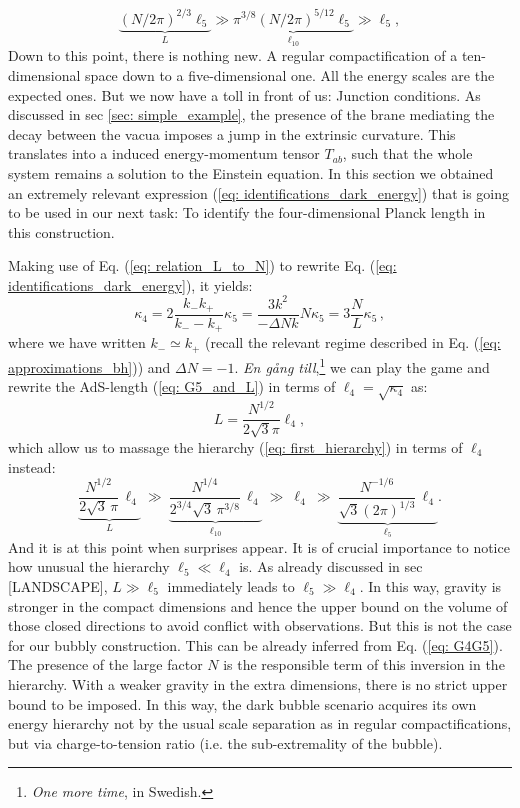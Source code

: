 \begin{equation}\label{eq: first_hierarchy}
    \underbrace{\left(N/2 \pi \right)^{2/3} \ell_5}_{L} \gg\underbrace{\pi^{3/8} \left(N/2\pi\right)^{5/12} \ell_{5}}_{\ell_{10}}\gg \ell_{5},
\end{equation}
Down to this point, there is nothing new. A regular compactification of a ten-dimensional space down to a five-dimensional one. All the energy scales are the expected ones. But we now have a toll in front of us: Junction conditions. As discussed in sec \ref{sec: simple_example}, the presence of the brane mediating the decay between the vacua imposes a jump in the extrinsic curvature. This translates into a induced energy-momentum tensor $T_{ab}$, such that the whole system remains a solution to the Einstein equation. In this section we obtained an extremely relevant expression (\ref{eq: identifications_dark_energy}) that is going to be used in our next task: To identify the four-dimensional Planck length in this construction.

Making use of Eq. (\ref{eq: relation_L_to_N}) to rewrite Eq. (\ref{eq: identifications_dark_energy}), it yields:
\begin{equation} \label{eq: G4G5}
\kappa_4=2\frac{k_- k_+}{k_- - k_+} \kappa_5 =\frac{3 k^2}{-\Delta N k}N \kappa_5 =3\frac{N}{L} \kappa_5 \, , 
\end{equation}
where we have written $k_{-} \simeq k_{+}$ (recall the relevant regime described in Eq. (\ref{eq: approximations_bh})) and $\Delta N = -1$. \textit{En gång till},\footnote{\textit{One more time}, in Swedish.} we can play the game and rewrite the AdS-length (\ref{eq: G5_and_L}) in terms of $\ell_{4} = \sqrt{\kappa_{4}}$ as:
\begin{equation}\label{eq: Ldpendingl4}
    L = \frac{N^{1/2}}{2\sqrt{3} \pi} \ell_4,
\end{equation}
which allow us to massage the hierarchy (\ref{eq: first_hierarchy}) in terms of $\ell_4$ instead:
\begin{equation}\label{eq: second_hierarchy}
    \underbrace{\frac{N^{1/2}}{2 \sqrt{3}\, \pi} \,\ell_4}_{L} \:\gg\: \underbrace{\frac{N^{1/4}}{2^{3/4} \sqrt{3} \,\pi^{3/8}} \, \ell_{4}} _{\ell_{10}} \:\gg\: \ell_4 \:\gg\: \underbrace{\frac{N^{-1/6}}{\sqrt{3} (2\pi)^{1/3}} \, \ell_{4}}_{\ell_{5}}. 
\end{equation}
And it is at this point when surprises appear. It is of crucial importance to notice how unusual the hierarchy $\ell_{5} \ll \ell_{4}$ is. As already discussed in sec [LANDSCAPE], $L \gg \ell_{5}$ immediately leads to $\ell_{5} \gg \ell_{4}$. In this way, gravity is stronger in the compact dimensions and hence the upper bound on the volume of those closed directions to avoid conflict with observations. But this is not the case for our bubbly construction. This can be already inferred from Eq. (\ref{eq: G4G5}). The presence of the large factor $N$ is the responsible term of this inversion in the hierarchy. With a weaker gravity in the extra dimensions, there is no strict upper bound to be imposed. In this way, the dark bubble scenario acquires its own energy hierarchy not by the usual scale separation as in regular compactifications, but via charge-to-tension ratio (i.e. the sub-extremality of the bubble).

